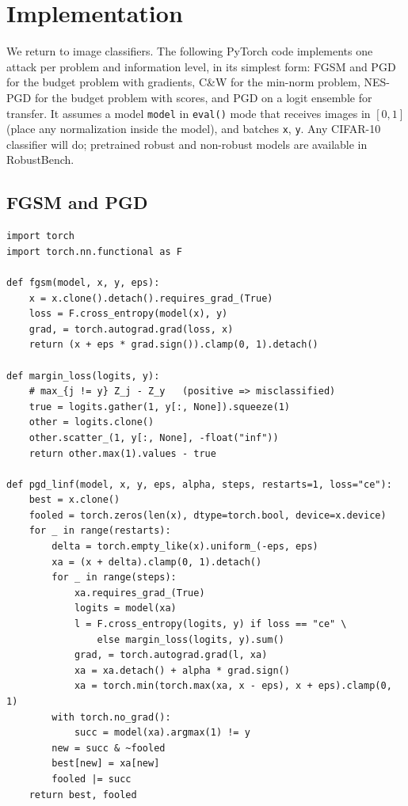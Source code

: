 \documentclass[10pt,a4paper]{extarticle}
\theoremstyle{definition}
\begin{document}
\section{Implementation}\label{sec:impl}

We return to image classifiers. The following PyTorch code implements one attack per problem and information level, in its simplest form: FGSM and PGD for the budget problem with gradients, C\&W for the min-norm problem, NES-PGD for the budget problem with scores, and PGD on a logit ensemble for transfer. It assumes a model \texttt{model} in \texttt{eval()} mode that receives images in \([0,1]\) (place any normalization inside the model), and batches \texttt{x}, \texttt{y}. Any CIFAR-10 classifier will do; pretrained robust and non-robust models are available in RobustBench.

\subsection{FGSM and PGD}

\begin{lstlisting}
import torch
import torch.nn.functional as F

def fgsm(model, x, y, eps):
    x = x.clone().detach().requires_grad_(True)
    loss = F.cross_entropy(model(x), y)
    grad, = torch.autograd.grad(loss, x)
    return (x + eps * grad.sign()).clamp(0, 1).detach()

def margin_loss(logits, y):
    # max_{j != y} Z_j - Z_y   (positive => misclassified)
    true = logits.gather(1, y[:, None]).squeeze(1)
    other = logits.clone()
    other.scatter_(1, y[:, None], -float("inf"))
    return other.max(1).values - true

def pgd_linf(model, x, y, eps, alpha, steps, restarts=1, loss="ce"):
    best = x.clone()
    fooled = torch.zeros(len(x), dtype=torch.bool, device=x.device)
    for _ in range(restarts):
        delta = torch.empty_like(x).uniform_(-eps, eps)
        xa = (x + delta).clamp(0, 1).detach()
        for _ in range(steps):
            xa.requires_grad_(True)
            logits = model(xa)
            l = F.cross_entropy(logits, y) if loss == "ce" \
                else margin_loss(logits, y).sum()
            grad, = torch.autograd.grad(l, xa)
            xa = xa.detach() + alpha * grad.sign()
            xa = torch.min(torch.max(xa, x - eps), x + eps).clamp(0, 1)
        with torch.no_grad():
            succ = model(xa).argmax(1) != y
        new = succ & ~fooled
        best[new] = xa[new]
        fooled |= succ
    return best, fooled
\end{lstlisting}
\end{document}

